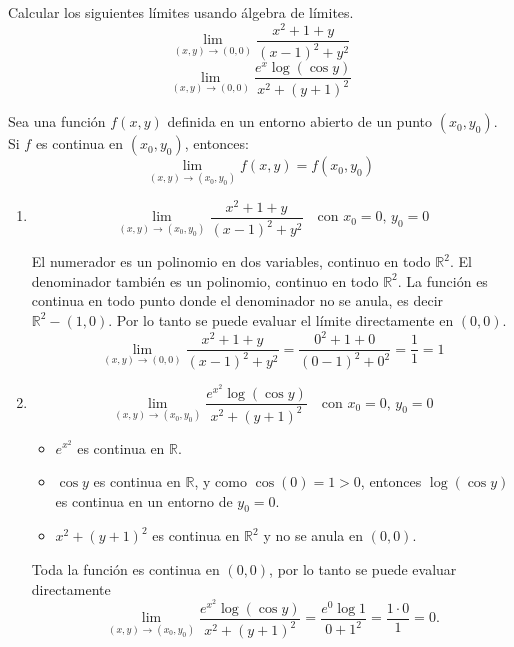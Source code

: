 \begin{example} Calcular los siguientes l\'imites usando \'algebra de l\'imites.
 \[
  \lim_{(x,y) \to (0,0)} \frac{x^2 +1 +  y}{(x-1)^2 +  y^2} 
 \]
 \[
  \lim_{(x,y) \to (0,0)} \frac{e^x \log(\cos y)}{x^2 + (y+1)^2}
 \]
 
 Sea una función $f(x, y)$ definida en un entorno abierto de un punto $(x_0, y_0)$. Si $f$ es continua en $(x_0, y_0)$, entonces:
 \[
 \lim_{(x, y) \to (x_0, y_0)} f(x, y) = f(x_0, y_0)
 \]
 \begin{enumerate}
     \item 
     \[
     \lim_{(x, y) \to (x_0, y_0)} \frac{x^2 + 1 + y}{(x - 1)^2 + y^2} \quad \text{con } x_0 = 0, \, y_0 = 0
     \]
 
     El numerador es un polinomio en dos variables, continuo en todo $\mathbb{R}^2$.  
     El denominador también es un polinomio, continuo en todo $\mathbb{R}^2$. La función es continua en todo punto donde el denominador no se anula, es decir $\mathbb{R}^2-(1,0)$. Por lo tanto se puede evaluar el límite directamente en $(0,0)$.
     \[
         \lim_{(x, y) \to (0,0)} \frac{x^2 + 1 + y}{(x - 1)^2 + y^2} = \frac{0^2 + 1 + 0}{(0 - 1)^2 + 0^2} = \frac{1}{1} = 1
     \]
 
     \item 
     \[
     \lim_{(x, y) \to (x_0, y_0)} \frac{e^{x^2} \log(\cos y)}{x^2 + (y + 1)^2} \quad \text{con } x_0 = 0, \, y_0 = 0
     \]
 
     \begin{itemize}
         \item $e^{x^2}$ es continua en $\mathbb{R}$.
         \item $\cos y$ es continua en $\mathbb{R}$, y como $\cos(0) = 1 > 0$, entonces $\log(\cos y)$ es continua en un entorno de $y_0 = 0$.
         \item $x^2 + (y + 1)^2$ es continua en $\mathbb{R}^2$ y no se anula en $(0,0)$.
     \end{itemize}
 
     Toda la función es continua en $(0,0)$, por lo tanto se puede evaluar directamente
     \[
         \lim_{(x, y) \to (x_0, y_0)} \frac{e^{x^2} \log(\cos y)}{x^2 + (y + 1)^2} =  \frac{e^0\log 1}{0 + 1^2} = \frac{1 \cdot 0}{1} = 0.
     \]
 \end{enumerate}

\end{example}

